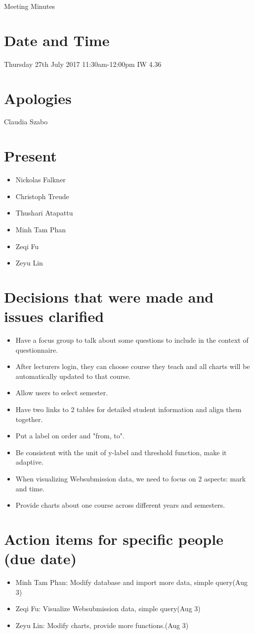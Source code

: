 \documentclass[11pt, a4paper]{article}
\begin{document}
\vspace*{15pt}

\begin{center}
\huge Meeting Minutes




\end{center}

\section{Date and Time}
Thursday 27th July 2017 11:30am-12:00pm IW 4.36

\section{Apologies}
Claudia Szabo

\section{Present}
\begin{itemize}
	\item Nickolas Falkner
	\item Christoph Treude 
	\item	Thushari Atapattu 
	\item Minh Tam Phan
	\item Zeqi Fu
	\item Zeyu Lin
\end{itemize}

\section{Decisions that were made and issues clarified}
\begin{itemize}
	\item Have a focus group to talk about some questions to include
	in the context of questionnaire.
	\item After lecturers login, they can choose course they teach and
	all charts will be automatically updated to that 
	course.
	\item Allow users to select semester.
	\item Have two links to 2 tables for detailed student information
	and align them together.
	\item Put a label on order and "from, to".
	\item Be consistent with the unit of y-label and threshold function,
	make it adaptive.
	\item When visualizing Websubmission data, we need to focus on 2
	aspects: mark and time.
	\item Provide charts about one course across different years
	and semesters.
\end{itemize}

\section{Action items for specific people (due date)}
\begin{itemize}
	\item Minh Tam Phan: Modify database and import more data, simple query(Aug 3)
	\item Zeqi Fu: Visualize Websubmission data, simple query(Aug 3)
	\item Zeyu Lin: Modify charts, provide more functions.(Aug 3)

\end{itemize}
\end{document}
